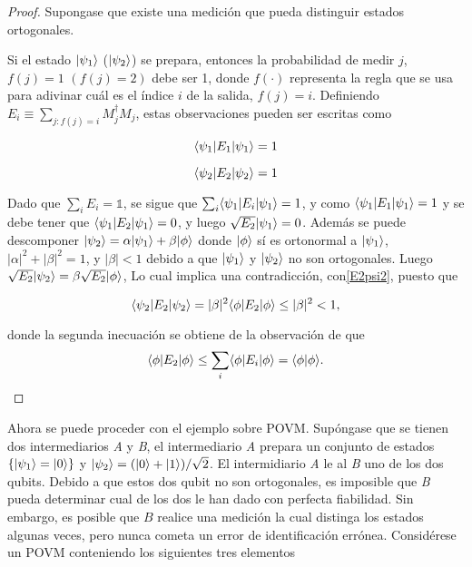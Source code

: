 \begin{proof}
Supongase que existe una medición que pueda distinguir estados ortogonales.


Si el estado $|\psi_1\rangle $ ($|\psi_2\rangle $) se prepara, entonces la
probabilidad de medir $j$, $f(j) =1$ $(f(j)=2)$ debe ser 1, donde $f(\cdot)$ representa
la regla que se usa para adivinar cuál es el índice $i$ de la salida, $f(j)=i$. 
Definiendo $E_i\equiv \sum_{j:f(j)=i}M_j^\dagger M_j$, estas observaciones pueden
ser escritas como


\begin{equation}\label{E1psi1}
	\langle \psi_1|E_1|\psi_1\rangle=1
\end{equation}

\begin{equation}\label{E2psi2}
	\langle \psi_2|E_2|\psi_2\rangle=1
\end{equation}

Dado que $\sum_i E_i=\mathds{1}$, se sigue que $\sum_i \langle \psi_1|E_i|\psi_1\rangle=1$,
y como $\langle \psi_1|E_1|\psi_1\rangle=1$ y se debe tener que $\langle \psi_1|E_2|\psi_1\rangle=0$,
y luego $\sqrt{E_2}|\psi_1\rangle=0$. Además se puede descomponer  
$|\psi_2\rangle=\alpha|\psi_1\rangle +\beta|\phi\rangle$ donde $|\phi\rangle$ sí es ortonormal
a $|\psi_1\rangle $, $|\alpha|^2+|\beta|^2=1$, y $|\beta|<1$ debido a que $|\psi_1\rangle$
y $|\psi_2\rangle$ no son ortogonales. Luego $\sqrt{E_2}|\psi_2\rangle=\beta \sqrt{E_2}|\phi\rangle$, Lo
cual implica una contradicción, con{\ref{E2psi2}}, puesto que

\begin{equation}
	\langle \psi_2|E_2|\psi_2\rangle=|\beta|^2 \langle\phi|E_2|\phi\rangle \le |\beta|^2<1,
\end{equation}

donde la segunda inecuación se obtiene de la observación de que 
\[ \langle \phi|E_2|\phi\rangle \le \sum_i\langle \phi|E_i|\phi\rangle= \langle\phi|\phi\rangle. \]


\end{proof}


Ahora se puede proceder con el ejemplo sobre POVM\@. Supóngase que se tienen dos intermediarios \textit{A} y \textit{B}, el intermediario \textit{A} prepara un conjunto de estados $\{|\psi_1\rangle=|0\rangle\}$ y $|\psi_2\rangle=(|0\rangle +|1\rangle)/\sqrt{2}$. El intermidiario \textit{A} le al \textit{B} uno de los dos qubits. Debido a que estos dos qubit no son ortogonales, es imposible que \textit{B} pueda determinar cual de los dos le han dado con perfecta fiabilidad. Sin embargo, es posible que $B$ realice una medición la cual distinga los estados algunas veces, pero nunca cometa un error de identificación errónea. Considérese un POVM conteniendo los siguientes tres elementos 

